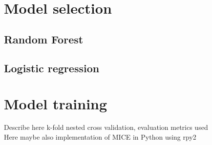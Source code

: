 \section{Model selection}
\subsection{Random Forest}
\subsection{Logistic regression}
\section{Model training}
\begin{changemargin}{50pt}{50pt}
 Describe here k-fold nested cross validation, evaluation metrics used
 \\
 Here maybe also implementation of MICE in Python using rpy2
\end{changemargin}
